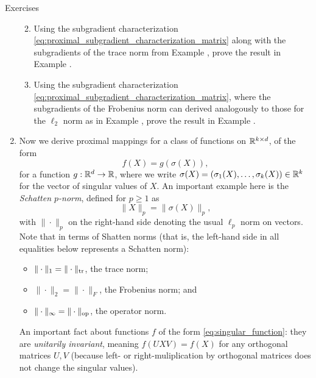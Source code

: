 \begin{xcb}{Exercises}
\begin{enumerate}[label=\thechapter.\arabic*]
\begin{enumerate}[label=\alph*.]
\item Using the subgradient characterization 
  \eqref{eq:proximal_subgradient_characterization_matrix} along with the
  subgradients of the trace norm from Example
  , prove the result in Example
  . 

\item Using the subgradient characterization 
  \eqref{eq:proximal_subgradient_characterization_matrix}, where the
  subgradients of the Frobenius norm can derived analogously to those for the
  $\ell_2$ norm as in Example , prove the result
  in Example .  
\end{enumerate}

\item \label{ex:matrix_norm_proximal_mapping2}
  Now we derive proximal mappings for a class of functions on $\mathbb{R}^{k \times d}$,
  of the form 
  \begin{equation}
  \label{eq:singular_function}
  f(X) = g(\sigma(X)), 
  \end{equation}
  for a function $g : \mathbb{R}^d \to \mathbb{R}$, where we write $\sigma(X) = (\sigma_1(X), \ldots,
  \sigma_k(X)) \in \mathbb{R}^k$ for the vector of singular values of $X$. An important
  example here is the \emph{Schatten $p$-norm}, defined for $p \geq 1$ as
  \begin{equation}
  \label{eq:schatten_norm}
  \|X\|_p = \|\sigma(X)\|_p,
  \end{equation}
  with $\|\cdot\|_p$ on the right-hand side denoting the usual $\ell_p$ norm on
  vectors. Note that in terms of Shatten norms (that is, the left-hand side in
  all equalities below represents a Schatten norm): 
  \begin{itemize}
  \item $\|\cdot\|_1 = \|\cdot\|_{\operatorname{tr}}$, the trace norm;
  \item $\|\cdot\|_2 = \|\cdot\|_F$, the Frobenius norm; and
  \item $\|\cdot\|_\infty = \|\cdot\|_{\mathrm{op}}$, the operator norm.  
  \end{itemize}
  An important fact about functions $f$ of the form
  \eqref{eq:singular_function}: they are \emph{unitarily invariant}, meaning 
  $f(UXV) = f(X)$ for any orthogonal matrices $U,V$ (because left- or
  right-muliplication by orthogonal matrices does not change the singular
  values).    
  

\end{enumerate}
\end{xcb}

